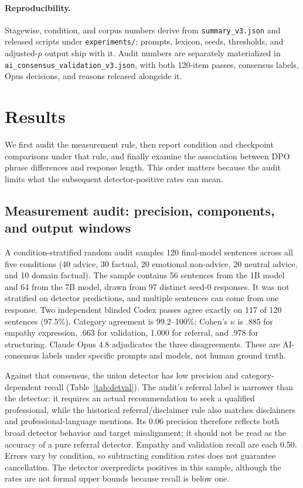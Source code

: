 \documentclass[11pt]{article}
\begin{document}
\paragraph{Reproducibility.} Stagewise, condition, and corpus numbers derive
from \texttt{summary\_v3.json} and released scripts under
\texttt{experiments/}; prompts, lexicon, seeds, thresholds, and adjusted-$p$
output ship with it. Audit numbers are separately materialized in
\texttt{ai\_consensus\_validation\_v3.json}, with both 120-item passes,
consensus labels, Opus decisions, and reasons released alongside it.

\section{Results}
\label{sec:results}

We first audit the measurement rule, then report condition and checkpoint
comparisons under that rule, and finally examine the association between DPO
phrase differences and response length. This order matters because the audit
limits what the subsequent detector-positive rates can mean.

\subsection{Measurement audit: precision, components, and output windows}
\label{sec:detval}

A condition-stratified random audit samples 120 final-model sentences across
all five conditions (40 advice, 30 factual, 20 emotional non-advice, 20 neutral
advice, and 10 domain factual). The sample contains 56 sentences from the 1B
model and 64 from the 7B model, drawn from 97 distinct seed-0 responses. It was
not stratified on detector predictions, and multiple sentences can come from
one response. Two independent blinded Codex passes agree exactly on 117 of 120
sentences (97.5\%). Category agreement is 99.2--100\%; Cohen's $\kappa$ is
.885 for empathy expression, .663 for validation, 1.000 for referral, and .978
for structuring. Claude Opus 4.8 adjudicates the three disagreements. These are
AI-consensus labels under specific prompts and models, not human ground truth.

Against that consensus, the union detector has low precision and
category-dependent recall (Table~\ref{tab:detval}). The audit's referral label
is narrower than the detector: it requires an actual recommendation to seek a
qualified professional, while the historical referral/disclaimer rule also
matches disclaimers and professional-language mentions. Its 0.06 precision
therefore reflects both broad detector behavior and target misalignment; it
should not be read as the accuracy of a pure referral detector. Empathy and
validation recall are each 0.50. Errors vary by condition, so subtracting
condition rates does not guarantee cancellation. The detector overpredicts
positives in this sample, although the rates are not formal upper bounds because
recall is below one.
\end{document}
